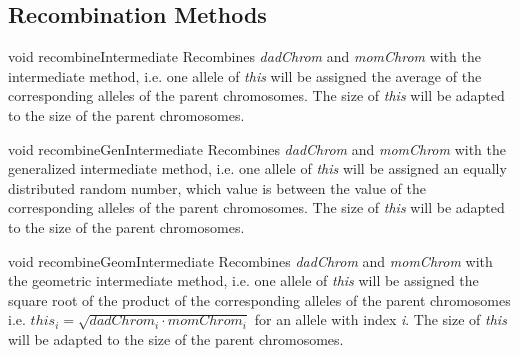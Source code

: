\subsection{Recombination Methods}

\setNormalInstance
\setCorrectWidthThree{8pt}
\printMethodWithParamsSaved
{void}
{}
{recombineIntermediate}
{Recombines {\em dadChrom} and {\em momChrom} with the intermediate method, 
 i.e. one allele
 of {\em this} will be assigned the average of the corresponding
 alleles of the parent chromosomes. The size of {\em this} will be
 adapted to the size of the parent chromosomes.}
{}
\setCorrectWidthThree{4pt}

\clearpage

\setNormalInstance
\setCorrectWidthThree{8pt}
\printMethodWithParamsSaved
{void}
{}
{recombineGenIntermediate}
{Recombines {\em dadChrom} and
 {\em momChrom} with the generalized intermediate method, i.e.
 one allele of {\em this} will be assigned an equally distributed
 random number, which value is between the value of the corresponding
 alleles of the parent chromosomes. The size of {\em this} will be
 adapted to the size of the parent chromosomes.}
{}
\setCorrectWidthThree{4pt}

\vspace*{4ex}

\setNormalInstance
\setCorrectWidthThree{8pt}
\printMethodWithParamsSaved
{void}
{}
{recombineGeomIntermediate}
{Recombines {\em dadChrom} and
 {\em momChrom} with the geometric intermediate method, i.e.
 one allele of {\em this} will be assigned the square root of the
 product of the corresponding alleles of the parent chromosomes i.e.
 $this_i = \sqrt{dadChrom_i \cdot momChrom_i}$ for an allele with index
 {\em i}. The size of {\em this} will be adapted to the size of 
 the parent chromosomes.}
{}
\setCorrectWidthThree{4pt}

